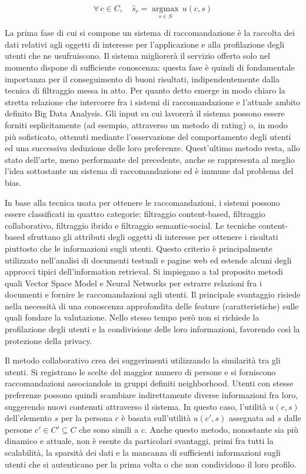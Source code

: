 \documentclass[Lau,binding=0.6cm,noexaminfo]{sapthesis}
\newcommand{\argmax}{\mathop{\mathrm{argmax}}\limits}
\begin{document}
\[
\forall \, c \in C, \quad \hat{s}_c = \argmax_{s \in S} \, u(c, s)
\]

\medskip

La prima fase di cui si compone un sistema di raccomandazione è la raccolta dei dati relativi agli oggetti di interesse per l'applicazione e alla profilazione degli utenti che ne usufruiscono. Il sistema migliorerà il servizio offerto solo nel momento dispone di sufficiente conoscenza: questa fase è quindi di fondamentale importanza per il conseguimento di buoni risultati, indipendentemente dalla tecnica di filtraggio messa in atto. Per quanto detto emerge in modo chiaro la stretta relazione che intercorre fra i sistemi di raccomandazione e l'attuale ambito definito Big Data Analysis.
Gli input su cui lavorerà il sistema possono essere forniti esplicitamente (ad esempio, attraverso un metodo di rating) o, in modo più sofisticato, ottenuti mediante l'osservazione del comportamento degli utenti ed una successiva deduzione delle loro preferenze. Quest'ultimo metodo resta, allo stato dell'arte, meno performante del precedente, anche se rappresenta al meglio l'idea sottostante un sistema di raccomandazione ed è immune dal problema del bias.\medskip

In base alla tecnica usata per ottenere le raccomandazioni, i sistemi possono essere classificati in quattro categorie: filtraggio content-based, filtraggio collaborativo, filtraggio ibrido e filtraggio semantic-social. Le tecniche content-based sfruttano gli attributi degli oggetti di interesse per ottenere i risultati piuttosto che le informazioni sugli utenti.
Questo criterio è principalmente utilizzato nell'analisi di documenti testuali e pagine web ed estende alcuni degli approcci tipici dell'information retrieval. Si impiegano a tal proposito metodi quali Vector Space Model e Neural Networks per estrarre relazioni fra i documenti e fornire le raccomandazioni agli utenti. Il principale svantaggio risiede nella necessità di una conoscenza approfondita delle feature (caratteristiche) sulle quali fondare la valutazione. Nello stesso tempo però non si richiede la profilazione degli utenti e la condivisione delle loro informazioni, favorendo così la protezione della privacy.\medskip

Il metodo collaborativo crea dei suggerimenti utilizzando la similarità tra gli utenti. Si registrano le scelte del maggior numero di persone e si forniscono raccomandazioni associandole in gruppi definiti neighborhood. Utenti con stesse preferenze possono quindi scambiare indirettamente diverse informazioni fra loro, suggerendo nuovi contenuti attraverso il sistema.
In questo caso, l'utilità $u(c,s)$ dell'elemento $s$ per la persona $c$ è basata sull'utilità $u(c',s)$ assegnata ad $s$ dalle persone $c' \in C' \subseteq C$ che sono simili a $c$. Anche questo metodo, nonostante sia più dinamico e attuale, non è esente da particolari svantaggi, primi fra tutti la scalabilità, la sparsità dei dati e la mancanza di sufficienti informazioni sugli utenti che si autenticano per la prima volta o che non condividono il loro profilo.\medskip
\end{document}
